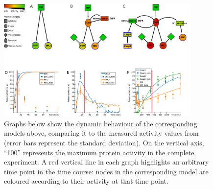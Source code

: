 \documentclass{bmcart}
\begin{document}
\begin{figure}[!htbp]
\centering
  \includegraphics[width=0.9\textwidth]{Figures/7}
  \caption{
Graphs below show the dynamic behaviour of the corresponding models above, comparing it to the measured
activity values from~\cite{pathway-compendium} (error bars represent the standard deviation).
On the vertical axis, ``100'' represents the maximum protein activity in the complete experiment.
A red vertical line in each graph highlights an arbitrary time point in the time course:
nodes in the corresponding model are coloured according to their activity at that time point.
}
\end{figure}
\end{document}
